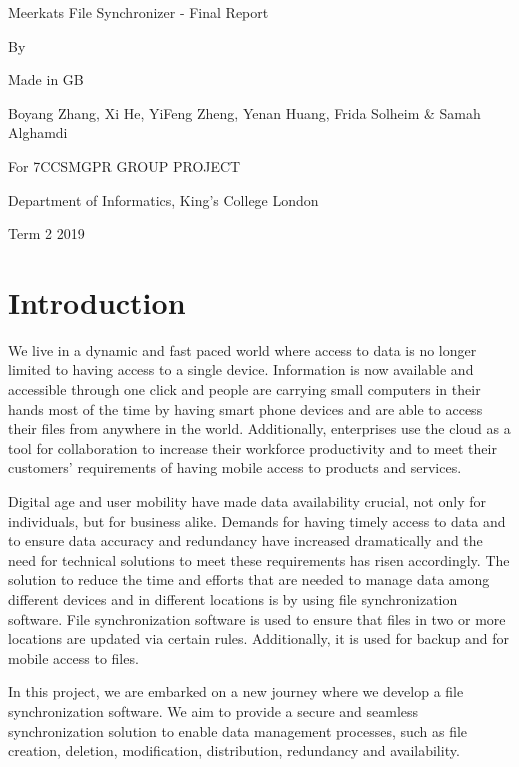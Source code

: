 \documentclass{article}
\begin{document}
\begin{center}
\thispagestyle{empty}
\parskip=14pt%
\vspace*{3\parskip}%
Meerkats File Synchronizer - Final Report

By

Made in GB

Boyang Zhang, Xi He, YiFeng Zheng,
 Yenan Huang, Frida Solheim \& Samah Alghamdi

For 7CCSMGPR GROUP PROJECT

Department of Informatics, King's College London

Term 2 2019
\end{center}
\newpage


\tableofcontents
\newpage

\section{Introduction}
We live in a dynamic and fast paced world where access to data is no longer limited to having access to a single device. Information is now available and accessible through one click and people are carrying small computers in their hands most of the time by having smart phone devices and are able to access their files from anywhere in the world. Additionally, enterprises use the cloud as a tool for collaboration to increase their workforce productivity and to meet their customers’ requirements of having mobile access to products and services.

Digital age and user mobility have made data availability crucial, not only for individuals, but for business alike. Demands for having timely access to data and to ensure data accuracy and redundancy have increased dramatically and the need for technical solutions to meet these requirements has risen accordingly. The solution to reduce the time and efforts that are needed to manage data among different devices and in different locations is by using file synchronization software. File synchronization software is used to ensure that files in two or more locations are updated via certain rules. Additionally, it is used for backup and for mobile access to files.


\hfill \break
In this project, we are embarked on a new journey where we develop a file synchronization software. We aim to provide a secure and seamless synchronization solution to enable data management processes, such as file creation, deletion, modification, distribution, redundancy and availability.
\end{document}
